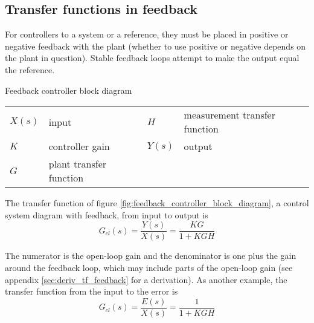 \subsection{Transfer functions in feedback}

For \glspl{controller} to  a \gls{system} or
 a reference, they must be placed in positive or
negative feedback with the \gls{plant} (whether to use positive or negative
depends on the \gls{plant} in question). Stable feedback loops attempt to make
the \gls{output} equal the \gls{reference}.
\begin{bookfigure}

  \caption{Feedback controller block diagram}
  \label{fig:feedback_controller_block_diagram}
  \begin{figurekey}
    \begin{tabular}{llll}
      $X(s)$ & input & $H$ & measurement transfer function \\
      $K$ & controller gain & $Y(s)$ & output \\
      $G$ & plant transfer function & & \\
    \end{tabular}
  \end{figurekey}
\end{bookfigure}

The transfer function of figure \ref{fig:feedback_controller_block_diagram}, a
\gls{control system} diagram with feedback, from input to output is
\begin{equation}
  G_{cl}(s) = \frac{Y(s)}{X(s)} = \frac{KG}{1 + KGH}
\end{equation}

The numerator is the \gls{open-loop gain} and the denominator is one plus the
gain around the feedback loop, which may include parts of the
\gls{open-loop gain} (see appendix \ref{sec:deriv_tf_feedback} for a
derivation). As another example, the transfer function from the input to the
\gls{error} is
\begin{equation}
  G_{cl}(s) = \frac{E(s)}{X(s)} = \frac{1}{1 + KGH}
\end{equation}

